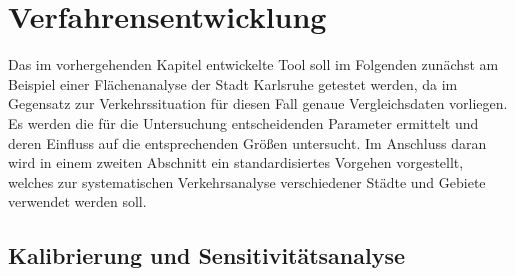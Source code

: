 \section{Verfahrensentwicklung}


Das im vorhergehenden Kapitel entwickelte Tool soll im Folgenden zunächst am Beispiel einer Flächenanalyse der Stadt Karlsruhe getestet werden, da im Gegensatz zur Verkehrssituation für diesen Fall genaue Vergleichsdaten vorliegen. Es werden die für die Untersuchung entscheidenden Parameter ermittelt und deren Einfluss auf die entsprechenden Größen untersucht. Im Anschluss daran wird in einem zweiten Abschnitt ein standardisiertes Vorgehen vorgestellt, welches zur systematischen Verkehrsanalyse verschiedener Städte und Gebiete verwendet werden soll.

\subsection{Kalibrierung und Sensitivitätsanalyse}

